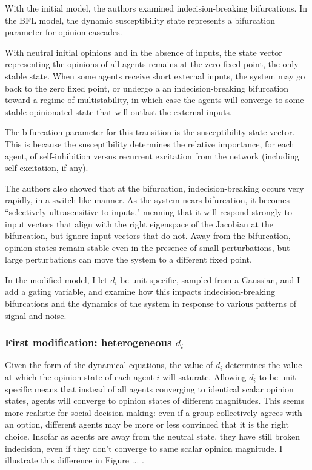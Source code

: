 \documentclass[]{article}
\begin{document}
With the initial model, the authors examined indecision-breaking bifurcations. In the BFL model, the dynamic susceptibility state represents a bifurcation parameter for opinion cascades. 

With neutral initial opinions and in the absence of inputs, the state vector representing the opinions of all agents remains at the zero fixed point, the only stable state. When some agents receive short external inputs, the system may go back to the zero fixed point, or undergo a an indecision-breaking bifurcation toward a regime of multistability, in which case the agents will converge to some stable opinionated state that will outlast the external inputs. 

The bifurcation parameter for this transition is the susceptibility state vector. This is because the susceptibility determines the relative importance, for each agent, of self-inhibition versus recurrent excitation from the network (including self-excitation, if any).

The authors also showed that at the bifurcation, indecision-breaking occurs very rapidly, in a switch-like manner. As the system nears bifurcation, it becomes ``selectively ultrasensitive to inputs," meaning that it will respond strongly to input vectors that align with the right eigenspace of the Jacobian at the bifurcation, but ignore input vectors that do not. Away from the bifurcation, opinion states remain stable even in the presence of small perturbations, but large perturbations can move the system to a different fixed point.

In the modified model, I let $d_i$ be unit specific, sampled from a Gaussian, and I add a gating variable, and examine how this impacts indecision-breaking bifurcations and the dynamics of the system in response to various patterns of signal and noise. 

\subsubsection{First modification: heterogeneous $d_i$}

Given the form of the dynamical equations, the value of $d_i$ determines the value at which the opinion state of each agent $i$ will saturate. Allowing $d_i$ to be unit-specific means that instead of all agents converging to identical scalar opinion states, agents will converge to opinion states of different magnitudes. This seems more realistic for social decision-making: even if a group collectively agrees with an option, different agents may be more or less convinced that it is the right choice. Insofar as agents are away from the neutral state, they have still broken indecision, even if they don't converge to same scalar opinion magnitude. I illustrate this difference in Figure ... .
\end{document}
